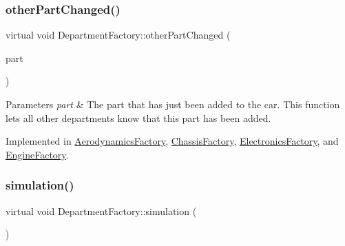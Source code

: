 \mbox{\label{classDepartmentFactory_a41e5c96ee84f8237cb08d31cd782efae}} 
\subsubsection{\texorpdfstring{other\+Part\+Changed()}{otherPartChanged()}}
{\footnotesize\ttfamily virtual void Department\+Factory\+::other\+Part\+Changed (\begin{DoxyParamCaption}\item[{\hyperlink{classDepartmentOutput}{Department\+Output} $\ast$}]{part }\end{DoxyParamCaption})\hspace{0.3cm}{\ttfamily [pure virtual]}}


\begin{DoxyParams}{Parameters}
{\em part} & The part that has just been added to the car. This function lets all other departments know that this part has been added. \\
\hline
\end{DoxyParams}


Implemented in \hyperlink{classAerodynamicsFactory_a873e60729f4e8a74608fbf29322cf2f6}{Aerodynamics\+Factory}, \hyperlink{classChassisFactory_a15eb17dfcb995b9dcc75d4908e49a17f}{Chassis\+Factory}, \hyperlink{classElectronicsFactory_ae21ff30f4890eab2474fac71d2615941}{Electronics\+Factory}, and \hyperlink{classEngineFactory_a12c1223834cb2d653a1c659aa1504c51}{Engine\+Factory}.

\mbox{\label{classDepartmentFactory_ad7360e63135822e44031053723ff95fc}} 
\subsubsection{\texorpdfstring{simulation()}{simulation()}}
{\footnotesize\ttfamily virtual void Department\+Factory\+::simulation (\begin{DoxyParamCaption}{ }\end{DoxyParamCaption})\hspace{0.3cm}{\ttfamily [pure virtual]}}

